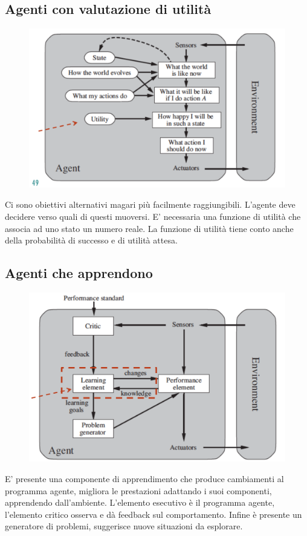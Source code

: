 \documentclass{article}
\begin{document}
\subsection{Agenti con valutazione di utilità}
\begin{figure}[H]
    \centering
    \includegraphics[scale=0.4]{Images/agentivalutazioneutilita.png}
\end{figure}
Ci sono obiettivi alternativi magari più facilmente raggiungibili. L'agente deve decidere verso quali di questi muoversi. E' necessaria una funzione di utilità che associa ad uno stato un numero reale. La funzione di utilità tiene conto anche della probabilità di successo e di utilità attesa.

\subsection{Agenti che apprendono}
\begin{figure}[H]
    \centering
    \includegraphics[scale=0.4]{Images/agenticheapprendono.png}
\end{figure}
E' presente una componente di apprendimento che produce cambiamenti al programma agente, migliora le prestazioni adattando i suoi componenti, apprendendo dall'ambiente. L'elemento esecutivo è il programma agente, l'elemento critico osserva e dà feedback sul comportamento. Infine è presente un generatore di problemi, suggerisce nuove situazioni da esplorare.
\end{document}
